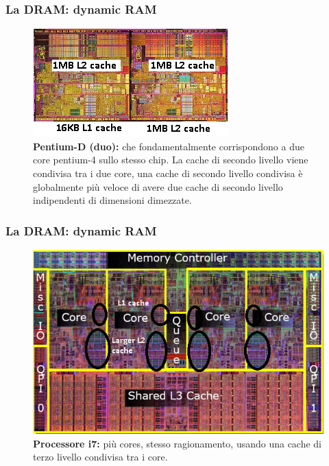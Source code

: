 \begin{frame}
	\frametitle{La DRAM: dynamic RAM}
	 
	\begin{figure}[!htbp] 
		\centering
		\includegraphics[width=0.8\linewidth]{images/5_memory/cache_4.png}
		\caption{\textbf{Pentium-D (duo):} che fondamentalmente corrispondono a due core pentium-4 sullo stesso chip. La cache di secondo livello viene condivisa tra i due core, una cache di secondo livello condivisa è globalmente più veloce di avere due cache di secondo livello indipendenti di dimensioni dimezzate.}
	\end{figure}
	
\end{frame}


\begin{frame}
	\frametitle{La DRAM: dynamic RAM}
	 
	\begin{figure}[!htbp] 
		\centering
		\includegraphics[width=0.8\linewidth]{images/5_memory/cache_5.png}
		\caption{\textbf{Processore i7:} più cores, stesso ragionamento, usando una cache di terzo livello condivisa tra i core.}
	\end{figure}

\end{frame}



